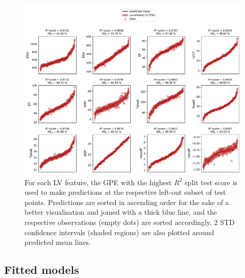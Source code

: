 \begin{figure}[!ht]
    \myfloatalign
    \includegraphics[width=\textwidth]{figures/chapter04/bgpes_vs_bsplit_ab.pdf}
    \caption{For each LV feature, the GPE with the highest $R^2$ split test score is used to make predictions at the respective left-out subset of test points. Predictions are sorted in ascending order for the sake of a better visualisation and joined with a thick blue line, and the respective observations (empty dots) are sorted accordingly. $2$ STD confidence intervals (shaded regions) are also plotted around predicted mean lines.}
    \label{fig:gpesexampleinferenceab}
\end{figure}


%
%
%
\subsection{Fitted models}

